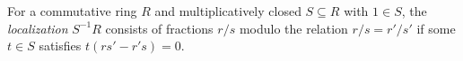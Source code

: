 
For a commutative ring $R$ and multiplicatively closed $S\subseteq R$ with $1\in S$, the \emph{localization} $S^{-1}R$ consists of fractions $r/s$ modulo the relation $r/s=r'/s'$ if some $t\in S$ satisfies $t(rs'-r's)=0$.
